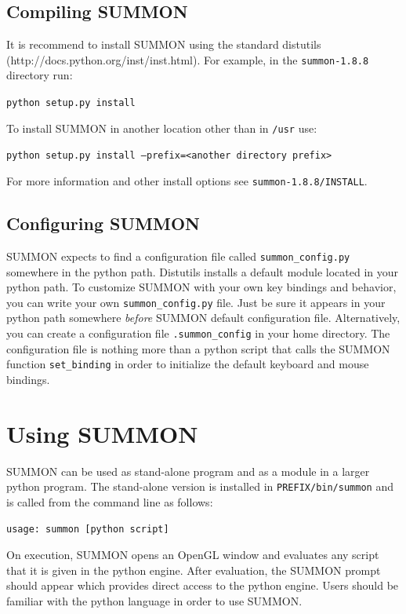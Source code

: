 \documentclass[12pt]{article}
\newcommand{\code}[1]{{\tt #1}}
\newcommand{\codeblock}[1]{\vspace{.1in} {\tt #1} \vspace{.1in}}
\newcommand{\version}{1.8.8}
\begin{document}
\subsection{Compiling SUMMON}

It is recommend to install SUMMON using the standard distutils 
(http://docs.python.org/inst/inst.html).  For example, in the
\code{summon-\version} directory run:

\codeblock{python setup.py install}

To install SUMMON in another location other than in \code{/usr} use:

\codeblock{python setup.py install --prefix=<another directory prefix>}

For more information and other install options see 
\code{summon-\version/INSTALL}.


\subsection{Configuring SUMMON}

SUMMON expects to find a configuration file called  \code{summon\_config.py}
somewhere in the python path.  Distutils installs a default module located in
your python path.  To customize SUMMON with your own key bindings and behavior,
you can write your own \code{summon\_config.py} file.  Just be sure it appears
in your python path somewhere {\em before} SUMMON default configuration file. 
Alternatively, you can create a configuration file \code{.summon\_config} in
your home directory.  The configuration file is nothing more than a python
script that calls the SUMMON function  \code{set\_binding} in order to
initialize the default keyboard and mouse  bindings.



\section{Using SUMMON}
\label{sec:using}

SUMMON can be used as stand-alone program and as a module in a larger python
program.  The stand-alone version is installed in \code{PREFIX/bin/summon} and
is called from the command line as follows:

\codeblock{usage: summon [python script]}

On execution, SUMMON opens an OpenGL window and evaluates any script that it is
given in the python engine. After evaluation, the SUMMON prompt should appear
which provides direct access to the python engine.  Users should be familiar
with the python language in order to use SUMMON.
\end{document}

